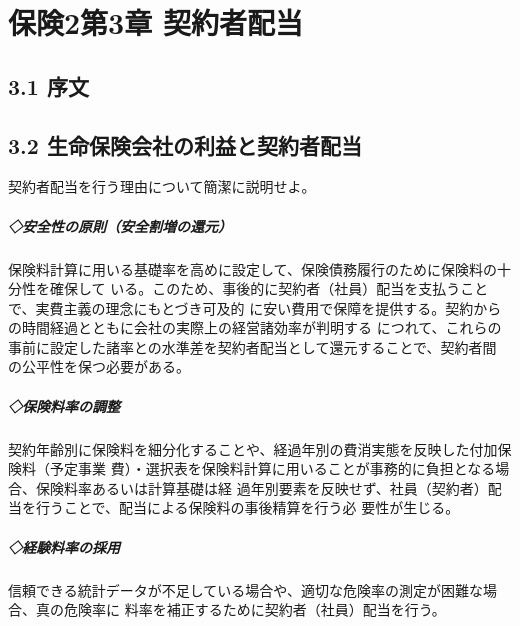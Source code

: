 \documentclass[report,gutter=10mm,fore-edge=10mm,uplatex,dvipdfmx]{jlreq}
\begin{document}
\chapter{保険2第3章 契約者配当}
\section{3.1 序文}
\section{3.2 生命保険会社の利益と契約者配当}
契約者配当を行う理由について簡潔に説明せよ。
\paragraph{◇安全性の原則（安全割増の還元）}
保険料計算に用いる基礎率を高めに設定して、保険債務履行のために保険料の十分性を確保して
いる。このため、事後的に契約者（社員）配当を支払うことで、実費主義の理念にもとづき可及的
に安い費用で保障を提供する。契約からの時間経過とともに会社の実際上の経営諸効率が判明する
につれて、これらの事前に設定した諸率との水準差を契約者配当として還元することで、契約者間
の公平性を保つ必要がある。
\paragraph{◇保険料率の調整}
契約年齢別に保険料を細分化することや、経過年別の費消実態を反映した付加保険料（予定事業
費）・選択表を保険料計算に用いることが事務的に負担となる場合、保険料率あるいは計算基礎は経
過年別要素を反映せず、社員（契約者）配当を行うことで、配当による保険料の事後精算を行う必
要性が生じる。
\paragraph{◇経験料率の採用}
信頼できる統計データが不足している場合や、適切な危険率の測定が困難な場合、真の危険率に
料率を補正するために契約者（社員）配当を行う。
\end{document}
